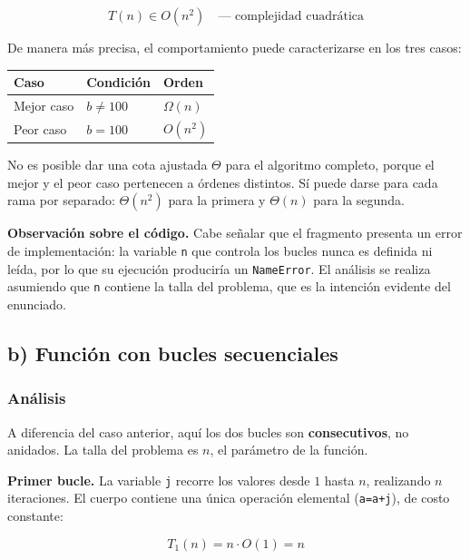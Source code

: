 \documentclass[12pt]{article}
\newcommand{\codigo}[1]{\texttt{\small #1}}
\newcommand{\pseudocodigo}[2]{%
}
\begin{document}
\[
\boxed{T(n) \in O(n^2) \quad \text{— complejidad cuadrática}}
\]

De manera más precisa, el comportamiento puede caracterizarse en los tres casos:

\begin{center}
\begin{tabular}{lll}
\toprule
\textbf{Caso} & \textbf{Condición} & \textbf{Orden} \\
\midrule
Mejor caso & $b \ne 100$ & $\Omega(n)$ \\
Peor caso  & $b = 100$   & $O(n^2)$ \\
\bottomrule
\end{tabular}
\end{center}

No es posible dar una cota ajustada $\Theta$ para el algoritmo completo, porque el mejor y el peor caso pertenecen a órdenes distintos. Sí puede darse para cada rama por separado: $\Theta(n^2)$ para la primera y $\Theta(n)$ para la segunda.

\textbf{Observación sobre el código.} Cabe señalar que el fragmento presenta un error de implementación: la variable \codigo{n} que controla los bucles nunca es definida ni leída, por lo que su ejecución produciría un \codigo{NameError}. El análisis se realiza asumiendo que \codigo{n} contiene la talla del problema, que es la intención evidente del enunciado.

\newpage

\subsection{b) Función con bucles secuenciales}

\pseudocodigo{ej07_b_funcion_ejemplo}{Función con dos bucles consecutivos}

\subsubsection*{Análisis}

A diferencia del caso anterior, aquí los dos bucles son \textbf{consecutivos}, no anidados. La talla del problema es $n$, el parámetro de la función.

\textbf{Primer bucle.} La variable \codigo{j} recorre los valores desde $1$ hasta $n$, realizando $n$ iteraciones. El cuerpo contiene una única operación elemental (\codigo{a=a+j}), de costo constante:

\[
T_1(n) = n \cdot O(1) = n
\]
\end{document}
